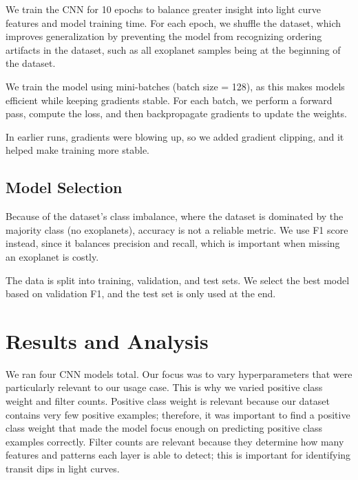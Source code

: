 \documentclass[conference]{IEEEtran}
\begin{document}
We train the CNN for 10 epochs to balance greater insight into light curve features and model training time. For each epoch, we shuffle the dataset, which improves generalization by preventing the model from recognizing ordering artifacts in the dataset, such as all exoplanet samples being at the beginning of the dataset.

We train the model using mini-batches (batch size = 128), as this makes models efficient while keeping gradients stable. For each batch, we perform a forward pass, compute the loss, and then backpropagate gradients to update the weights.

In earlier runs, gradients were blowing up, so we added gradient clipping, and it helped make training more stable.

\subsection{Model Selection}

Because of the dataset's class imbalance, where the dataset is dominated by the majority class (no exoplanets), accuracy is not a reliable metric. We use F1 score instead, since it balances precision and recall, which is important when missing an exoplanet is costly.

The data is split into training, validation, and test sets. We select the best model based on validation F1, and the test set is only used at the end.

\section{Results and Analysis}

We ran four CNN models total. Our focus was to vary hyperparameters that were particularly relevant to our usage case. This is why we varied positive class weight and filter counts. Positive class weight is relevant because our dataset contains very few positive examples; therefore, it was important to find a positive class weight that made the model focus enough on predicting positive class examples correctly. Filter counts are relevant because they determine how many features and patterns each layer is able to detect; this is important for identifying transit dips in light curves.
\end{document}
